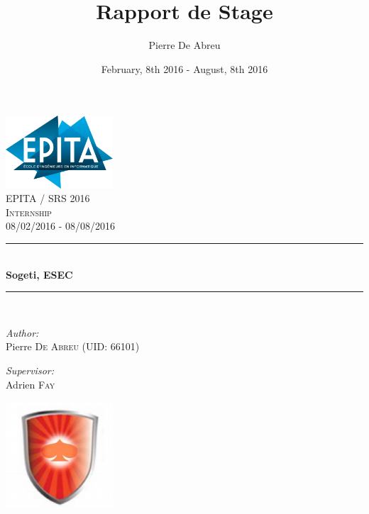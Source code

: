 \documentclass[a4paper, 12pt]{report}
\title{Rapport de Stage}
\author{Pierre De Abreu}
\date{February, 8th 2016 - August, 8th 2016}
\newcommand{\HRule}{\rule{\linewidth}{0.5mm}}
\begin{document}
\begin{titlepage}
\thispagestyle{frontpage}
\begin{center}

\includegraphics[width=0.3\textwidth]{images/epita.png}~\\[1cm]

\textsc{\LARGE EPITA / SRS 2016}\\[1.5cm]

\textsc{\Large  Internship}\\[0.5cm]
\textsc{\Large 08/02/2016 - 08/08/2016}

\HRule \\[0.4cm]
{ \huge \bfseries Sogeti, ESEC \\[0.4cm] }

\HRule \\[1.5cm]

\begin{minipage}{0.4\textwidth}
\begin{flushleft} \large
\emph{Author:}\\
Pierre \textsc{De Abreu (UID: 66101)}
\end{flushleft}
\end{minipage}
\begin{minipage}{0.4\textwidth}
\begin{flushright} \large
\emph{Supervisor:} \\
Adrien \textsc{Fay}
\end{flushright}
\end{minipage}

\includegraphics[width=0.3\textwidth]{images/esec.png}~\\[1cm]

\vfill

\end{center}
\end{titlepage}
\end{document}
